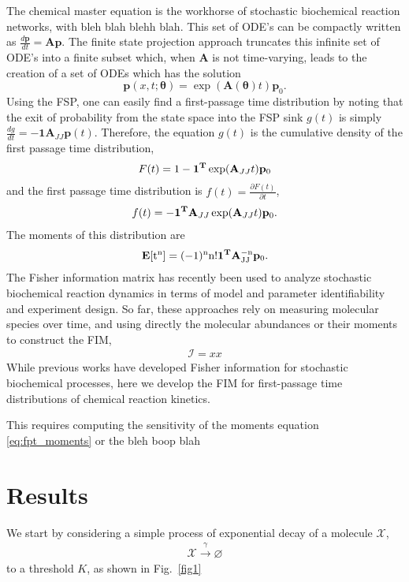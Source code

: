 \documentclass[aps,prl,preprint,groupedaddress]{revtex4-1}
\newcommand{\thv}{\boldsymbol{\theta}}
\newcommand{\Av}{\mathbf{A}}
\newcommand{\Tv}{\mathbf{T}}
\newcommand{\pv}{\mathbf{p}}
\newcommand{\Exp}{\rm{\mathbf{E}}}
\begin{document}
The chemical master equation \cite{xxx} is the workhorse of stochastic biochemical reaction networks, with bleh blah blehh blah.
This set of ODE's can be compactly written as $\frac{d \pv}{dt} = \Av \pv$. The finite state projection approach truncates this infinite set of ODE's into a finite subset which, when $\Av$ is not time-varying, leads to the creation of a set of ODEs which has the solution
\begin{equation}
  \pv(x,t;\thv) = \exp(\Av(\thv) t)\pv_0.
\end{equation}
Using the FSP, one can easily find a first-passage time distribution by noting that the exit of probability from the state space into the FSP sink $g(t)$ is simply $\frac{dg}{dt} = -\mathbf{1} {\Av_{JJ}} \pv(t)$.
Therefore, the equation $g(t)$ is the cumulative density of the first passage time distribution,
\begin{align}
    F(t) = 1 - \mathbf{1}^{\rm{\Tv}} \exp (\Av_{JJ}t) \pv_0
\end{align}
and the first passage time distribution is $ f(t) = \frac{\partial F(t)}{\partial{t}}$,
\begin{align}
    f(t) = -\mathbf{1}^{\rm{\Tv}} \Av_{JJ} \exp(\Av_{JJ}t) \pv_0.
\end{align}
The moments of this distribution are
\begin{align}
    \Exp [t^n] = (-1)^n n! \mathbf{1}^{\rm \Tv} \Av_{JJ}^{-n} \pv_0.
\end{align}
The Fisher information matrix has recently been used to analyze stochastic biochemical reaction dynamics \cite{xxx} in terms of model and parameter identifiability and experiment design. So far, these approaches rely on measuring molecular species over time, and using directly the molecular abundances or their moments to construct the FIM,
\begin{align}
  \mathcal{I} = xx
\end{align}
While previous works have developed Fisher information for stochastic biochemical processes, here we develop the FIM for first-passage time distributions of chemical reaction kinetics.

This requires computing the sensitivity of the moments equation \ref{eq:fpt_moments} or the bleh boop blah



\section{Results}
We start by considering a simple process of exponential decay of a molecule $\mathcal{X}$,
\begin{align}
  \mathcal{X}\xrightarrow{\gamma} \varnothing
\end{align}
to a threshold $K$, as shown in Fig.\ \ref{fig1}
\end{document}
